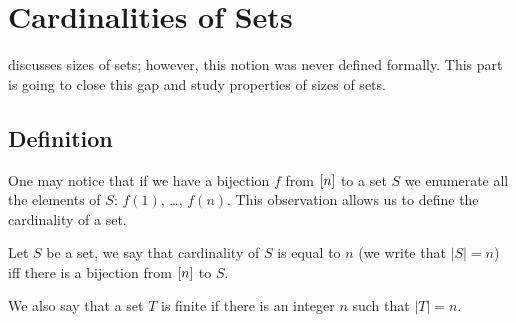 \chapter{Cardinalities of Sets}
\label{chapter:cardinality}
 discusses sizes of sets; however, this notion was
never defined formally. This part is going to close this gap and study
properties of sizes of sets.


\section{Definition}
One may notice that if we have a bijection $f$ from ${[{n}]}$ to a set $S$ we
enumerate all the elements of $S$: $f(1)$, \dots, $f(n)$.
This observation allows us to define the cardinality of a set.
\begin{definition}
  Let $S$ be a set, we say that cardinality of $S$ is equal to $n$ (we write
  that $|S| = n$) iff there is a bijection from ${[{n}]}$ to $S$.

  We also say that a set $T$ is finite if there is an integer $n$ such that
  $|T| = n$.
\end{definition}

